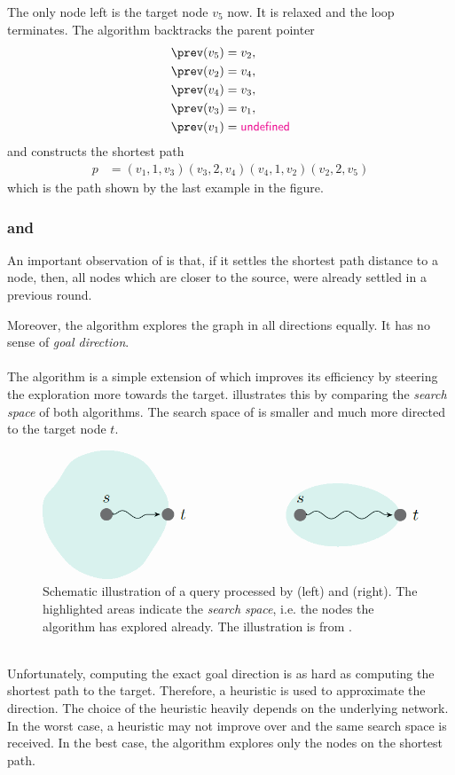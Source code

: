 	The only node left is the target node $v_5$ now. It is relaxed and the loop terminates.
	The algorithm backtracks the parent pointer
	\begin{align*}
		\prev(v_5)	&= v_2,\\
		\prev(v_2)	&= v_4,\\
		\prev(v_4)	&= v_3,\\
		\prev(v_3)	&= v_1,\\
		\prev(v_1)	&= \vundef
	\end{align*}
	and constructs the shortest path
	\begin{align*}
		p	&= (v_1, 1, v_3)(v_3, 2, v_4)(v_4, 1, v_2)(v_2, 2, v_5)
	\end{align*}
	which is the path shown by the last example in the figure.

\subsubsection{\astar and \alt}\label{alt}
	An important observation of \dijkstra is that, if it settles the shortest path distance to a node, then,
	all nodes which are closer to the source, were already settled in a previous round.
	
	Moreover, the algorithm explores the graph in all directions equally. It has no sense of \textit{goal direction}.\\\\
	The \astar algorithm  is a simple extension of \dijkstra which improves its efficiency by steering the
	exploration more towards the target.  illustrates this by comparing the \textit{search space}
	of both algorithms. The search space of \astar is smaller and much more directed to the target node $t$.
	\begin{figure}[!ht]
		 \begin{center}
			\includegraphics[scale=0.5]{res/dijkstra_vs_astar}
		\end{center}
		\caption{Schematic illustration of a query processed by \dijkstra (left) and \astar (right).
			The highlighted areas indicate the \textit{search space}, i.e. the nodes the algorithm has explored already.
			The illustration is from .}
		\label{dijkstra_vs_astar}
	\end{figure}\quad\\
	Unfortunately, computing the exact goal direction is as hard as computing the shortest path to the target.
	Therefore, a heuristic is used to approximate the direction. The choice of the heuristic heavily depends on the underlying network.
	In the worst case, a heuristic may not improve over \dijkstra and the same search space is received. In the best case,
	the algorithm explores only the nodes on the shortest path.
	
